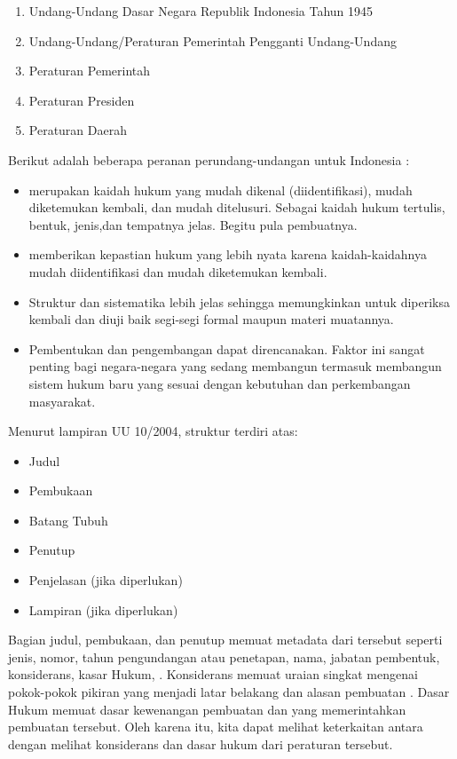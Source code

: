 \begin{enumerate}
  \item Undang-Undang Dasar Negara Republik Indonesia Tahun 1945
  \item Undang-Undang/Peraturan Pemerintah Pengganti Undang-Undang
  \item Peraturan Pemerintah
  \item Peraturan Presiden
  \item Peraturan Daerah
\end{enumerate}

Berikut adalah beberapa peranan perundang-undangan untuk Indonesia \citep{ilmu_perundang_undangan}:

\begin{itemize}
  \item \Legal merupakan kaidah hukum yang mudah dikenal (diidentifikasi),
        mudah diketemukan kembali, dan mudah ditelusuri. Sebagai kaidah hukum tertulis, bentuk,
        jenis,dan tempatnya jelas. Begitu pula pembuatnya.
  \item \Legal memberikan kepastian hukum yang lebih nyata karena
        kaidah-kaidahnya mudah diidentifikasi dan mudah diketemukan kembali.
  \item Struktur dan sistematika \legal lebih jelas sehingga memungkinkan
        untuk diperiksa kembali dan diuji baik segi-segi formal maupun materi muatannya.
  \item Pembentukan dan pengembangan \legal dapat direncanakan. Faktor ini
        sangat penting bagi negara-negara yang sedang membangun termasuk membangun sistem hukum baru yang
        sesuai dengan kebutuhan dan perkembangan masyarakat.
\end{itemize}

Menurut lampiran UU 10/2004, struktur \legal terdiri atas:

\begin{itemize}
  \item Judul
  \item Pembukaan
  \item Batang Tubuh
  \item Penutup
  \item Penjelasan (jika diperlukan)
  \item Lampiran (jika diperlukan)
\end{itemize}

Bagian judul, pembukaan, dan penutup memuat metadata dari \legal tersebut seperti jenis, nomor,
tahun pengundangan atau penetapan, nama, jabatan pembentuk, konsiderans, kasar Hukum, \legal.
Konsiderans memuat uraian singkat mengenai pokok-pokok pikiran yang menjadi latar belakang dan
alasan pembuatan \legal. Dasar Hukum memuat dasar kewenangan pembuatan \legal dan \legal yang
memerintahkan pembuatan \legal tersebut. Oleh karena itu, kita dapat melihat keterkaitan antara
\legal dengan melihat konsiderans dan dasar hukum dari peraturan tersebut.

